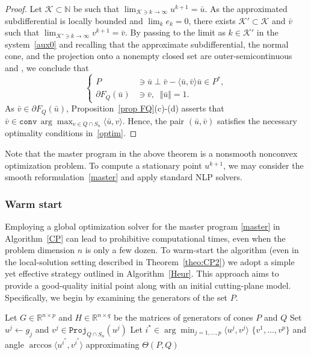 \documentclass[hidelinks,onefignum,onetabnum]{siamart250211}
\theoremstyle{definition}
\theoremstyle{remark}
\newcommand{\R}{\mathbb R}
\newcommand{\inner}[2]{\langle#1,#2\rangle}
\newcommand{\norm}[1]{\textstyle{\Vert} #1 \textstyle{\Vert}}
\newcommand{\proj}{\mathtt{Proj}}
\begin{document}
\begin{proof}
Let $\mathcal{K} \subset \mathbb{N}$ be such that $\lim_{\mathcal{K} \ni k \to \infty} u^{k+1} = \bar u$.
As the approximated subdifferential is locally bounded \cite[Lem. 2.10]{WWBook} and $\lim_k e_k =0$, there exists $\mathcal{K}' \subset \mathcal{K}$ and $\bar v $ such that $\lim_{\mathcal{K}'\ni k \to \infty} v^{k+1}=\bar v$.
By passing to the limit as $k \in \mathcal{K}'$ in the system~\eqref{aux0} and recalling that the approximate subdifferential, the normal cone, and the projection onto a nonempty closed set are outer-semicontinuous \cite[Prop 2.7, Lem. 3.2]{WWBook} and \cite[Example 5.23]{Rock-Wets}, we conclude that
\[
\left\{
\begin{array}{llll}
P&\ni \bar  u \perp  \bar  v  - \inner{\bar u}{\bar  v} \bar u \in P^*,\\
\partial F_Q(\bar u) &\ni  \bar v  ,\;\; \norm{\bar u} =1.
\end{array}
\right.
\]
As $\bar v \in \partial F_Q(\bar u)$, Proposition~\ref{prop FQ}(c)-(d)  asserts that $\bar v  \in \mathtt{conv}\, \arg\max_{v\in Q\cap S_n}\inner{\bar u}{v}$. Hence,  the pair $(\bar u,\bar v)$ satisfies the necessary optimality conditions in~\eqref{optim}.
\end{proof}

Note that the master program in the above theorem is a nonsmooth nonconvex optimization problem. To compute a stationary point $u^{k+1}$, we may consider the smooth reformulation~\eqref{master} and apply standard NLP solvers. 

\subsubsection*{Warm start}
Employing a global optimization solver for the master program \eqref{master} in Algorithm~\ref{CP} can lead to prohibitive computational times, even when the problem dimension $n$ is only a few dozen. To warm-start the algorithm (even in the local-solution setting described in Theorem~\ref{theo:CP2}) we adopt a simple yet effective strategy outlined in Algorithm~\ref{Heur}. This approach aims to provide a good-quality initial point along with an initial cutting-plane model. Specifically, we begin by examining the generators of the set $P$.\begin{algorithm}
\caption{Warm-start for the cutting-plane method}
\label{Heur}
\begin{algorithmic}[1]
\STATE  Let  $G \in \R^{n\times p}$ and $H\in \R^{n\times q}$ be the matrices of generators of cones $P$ and $Q$
\STATE Set $u^j\gets g_j$ and $v^j\in \proj_{Q\cap S_n}(u^j)$
\ENDFOR
\STATE Let $i^*\in \displaystyle \arg\min_{j=1,\ldots,p} \inner{u^j}{v^j}$
\RETURN $\{v^1,\ldots, v^{p}\}$ and angle $\arccos \inner{u^{i^*}}{v^{i^*}}$ approximating $\Theta(P,Q)$ 
  \end{algorithmic}
\end{algorithm}
\end{document}
